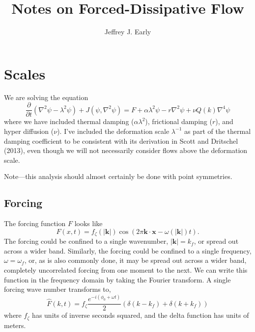 \documentclass[11pt]{article}
\title{Notes on Forced-Dissipative Flow}
\author{Jeffrey J. Early}
\begin{document}
\maketitle


\section{Scales}

We are solving the equation
\begin{equation}
\frac{\partial }{\partial t} \left( \nabla^2 \psi - \lambda^2 \psi \right)  + J\left( \psi, \nabla^2 \psi \right) = F + \alpha \lambda^2 \psi -r \nabla^2 \psi + \nu Q(k) \nabla^4 \psi 
\end{equation}
where we have included thermal damping ($\alpha \lambda^2$), frictional damping ($r$), and hyper diffusion ($\nu$). I've included the deformation scale $\lambda^{-1}$ as part of the thermal damping coefficient to be consistent with its derivation in Scott and Dritschel (2013), even though we will not necessarily consider flows above the deformation scale.

Note---this analysis should almost certainly be done with point symmetries.

%
\subsection{Forcing}
%

The forcing function $F$ looks like
\begin{equation}
F(x,t) = f_\zeta(|\mathbf{k}|) \cos \left( 2\pi \mathbf{k} \cdot \mathbf{x} - \omega(|\mathbf{k}|)t \right).
\end{equation}
The forcing could be confined to a single wavenumber, $|\mathbf{k}|= k_f$, or spread out across a wider band. Similarly, the forcing could be confined to a single frequency, $\omega=\omega_f$, or, as is also commonly done, it may be spread out across a wider band, completely uncorrelated forcing from one moment to the next. We can write this function in the frequency domain by taking the Fourier transform. A single forcing wave number transforms to,
\begin{equation}
\hat{F}(k,t) = f_\zeta \frac{e^{- i \left( \phi_0+\omega t\right)}}{2} \left( \delta \left(k -k_f\right) + \delta\left(k + k_f\right)  \right)
\end{equation}
where $f_\zeta$ has units of inverse seconds squared, and the delta function has units of meters.
\end{document}
